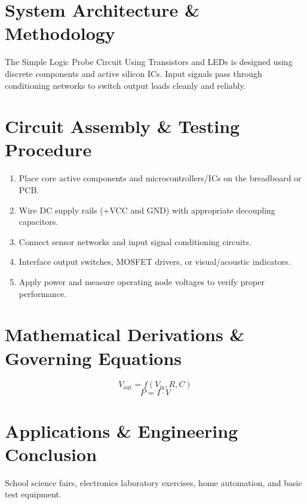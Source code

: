 \documentclass[11pt,a4paper]{article}
\begin{document}
\section{System Architecture \& Methodology}
The Simple Logic Probe Circuit Using Transistors and LEDs is designed using discrete components and active silicon ICs. Input signals pass through conditioning networks to switch output loads cleanly and reliably.

\section{Circuit Assembly \& Testing Procedure}
\begin{enumerate}
    \item Place core active components and microcontrollers/ICs on the breadboard or PCB.
    \item Wire DC supply rails (+VCC and GND) with appropriate decoupling capacitors.
    \item Connect sensor networks and input signal conditioning circuits.
    \item Interface output switches, MOSFET drivers, or visual/acoustic indicators.
    \item Apply power and measure operating node voltages to verify proper performance.
\end{enumerate}

\section{Mathematical Derivations \& Governing Equations}
\begin{equation}
V_{\text{out}} = f(V_{\text{in}}, R, C)
\end{equation}
\begin{equation}
P = I \cdot V
\end{equation}

\section{Applications \& Engineering Conclusion}
School science fairs, electronics laboratory exercises, home automation, and basic test equipment.
\end{document}
